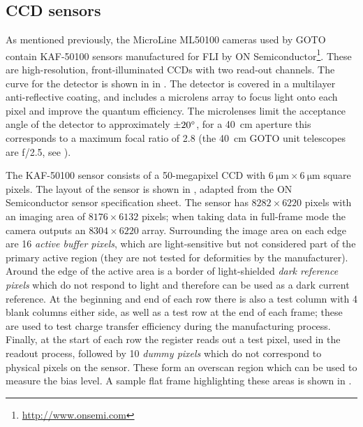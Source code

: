 \subsection{CCD sensors}
\label{sec:chip_layout}
\begin{colsection}

As mentioned previously, the MicroLine ML50100 cameras used by GOTO contain KAF-50100  sensors manufactured for FLI by ON Semiconductor\footnote{\url{http://www.onsemi.com}}. These are high-resolution, front-illuminated CCDs with two read-out channels. The  curve for the detector is shown in  in . The detector is covered in a multilayer anti-reflective coating, and includes a microlens array to focus light onto each pixel and improve the quantum efficiency. The microlenses limit the acceptance angle of the detector to approximately $\SI{\pm20}{\degree}$, for a \SI{40}{\centi\metre} aperture this corresponds to a maximum focal ratio of 2.8 (the \SI{40}{\centi\metre} GOTO unit telescopes are f/2.5, see ).

The KAF-50100 sensor consists of a 50-megapixel CCD with $\SI{6}{\micro\metre} \times \SI{6}{\micro\metre}$ square pixels. The layout of the sensor is shown in , adapted from the ON Semiconductor sensor specification sheet. The sensor has $8282 \times 6220$ pixels with an imaging area of $8176 \times 6132$ pixels; when taking data in full-frame mode the camera outputs an $8304 \times 6220$ array. Surrounding the image area on each edge are 16 \emph{active buffer pixels}, which are light-sensitive but not considered part of the primary active region (they are not tested for deformities by the manufacturer). Around the edge of the active area is a border of light-shielded \emph{dark reference pixels} which do not respond to light and therefore can be used as a dark current reference. At the beginning and end of each row there is also a test column with 4 blank columns either side, as well as a test row at the end of each frame; these are used to test charge transfer efficiency during the manufacturing process. Finally, at the start of each row the register reads out a test pixel, used in the readout process, followed by 10 \emph{dummy pixels} which do not correspond to physical pixels on the sensor. These form an overscan region which can be used to measure the bias level. A sample flat frame highlighting these areas is shown in .


\end{colsection}
